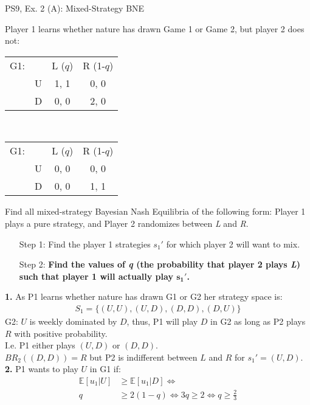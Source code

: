 \begin{frame}{PS9, Ex. 2 (A): Mixed-Strategy BNE}
    \begin{multicols}{2}
      Player 1 learns whether nature has drawn Game 1 or Game 2, but player 2 does not:
      \begin{table}
        \begin{tabular}{ll|c|c|}
          \multicolumn{1}{c}{G1:} & \multicolumn{1}{c}{} & \multicolumn{1}{c}{L ($q$)} & \multicolumn{1}{c}{R (1-$q$)} \\\cline{3-4}
          & U & 1, 1 & 0, 0 \\\cline{3-4}
          & D & 0, 0 & 2, 0 \\\cline{3-4}
        \end{tabular}\\\bigskip
        \begin{tabular}{ll|c|c|}
          \multicolumn{1}{c}{G1:} & \multicolumn{1}{c}{} & \multicolumn{1}{c}{L ($q$)} & \multicolumn{1}{c}{R (1-$q$)} \\\cline{3-4}
          & U & 0, 0 & 0, 0 \\\cline{3-4}
          & D & 0, 0 & 1, 1 \\\cline{3-4}
        \end{tabular}
      \end{table}
      Find all mixed-strategy Bayesian Nash Equilibria of the following form: Player 1 plays a pure strategy, and Player 2 randomizes between \textit{L} and \textit{R}.
      \begin{itemize}
        \item[Step 1:] Find the player 1 strategies $s_1'$ for which player 2 will want to mix.
        \item[Step 2:] \textbf{Find the values of \textit{q} (the probability that player 2 plays \textit{L}) such that player 1 will actually play $\bm{s_1'}$.}
      \end{itemize}
      \vfill\null\columnbreak
      \textbf{1.} As P1 learns whether nature has drawn G1 or G2 her strategy space is:
      \begin{align*}
        S_1=\{(U,U),(U,D),(D,D),(D,U)\}
      \end{align*}
      G2: $U$ is weekly dominated by $D$, thus, P1 will play $D$ in G2 as long as P2 plays $R$ with positive probability.\\\medskip I.e. P1 either plays $(U,D)$ or $(D,D)$.\\\medskip
      $BR_2((D,D))=R$ but P2 is indifferent between $L$ and $R$ for $s_1'=(U,D)$.\\\medskip
      \textbf{2.} P1 wants to play $U$ in G1 if:
      \begin{align*}
        \mathbb{E}[u_1|U]&\geq \mathbb{E}[u_1|D]\Leftrightarrow\\
        q&\geq2(1-q)\Leftrightarrow 3q\geq2 \Leftrightarrow q\geq\frac{2}{3}
      \end{align*}
      \vfill\null
    \end{multicols}
\end{frame}
